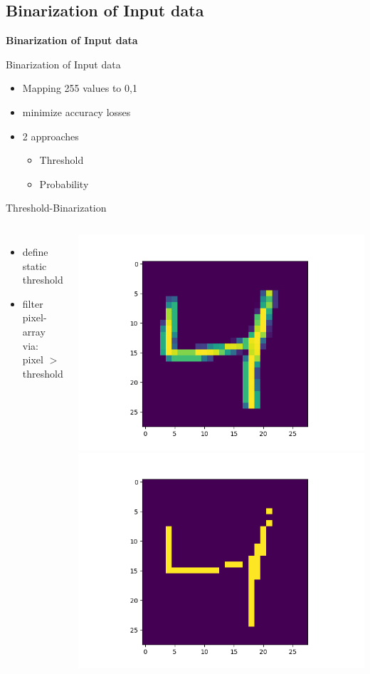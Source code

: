 \documentclass[aspectratio=1610, 12pt]{beamer}
\begin{document}
\subsection{Binarization of Input data}

\begin{frame}
	\centering
	\vfill
	\textbf{\Large Binarization of Input data}
	\vfill
\end{frame}

\begin{frame}{Binarization of Input data}
	\begin{itemize}
		\item Mapping 255 values to 0,1
		\item minimize accuracy losses
		\item 2 approaches
		\begin{itemize}
			 \item Threshold
			 \item Probability
		\end{itemize}
	\end{itemize}
\end{frame}

\begin{frame}{Threshold-Binarization}
	\begin{columns}
		\begin{itemize}
			\item define static threshold
			\item filter pixel-array via: \\pixel $>$ threshold
		\end{itemize}
		\centering
  		\includegraphics[width=.6\linewidth]{./images/comparison/default}
  		\includegraphics[width=.6\linewidth]{./images/comparison/threshold/200}

	\end{columns}
\end{frame}
\end{document}
